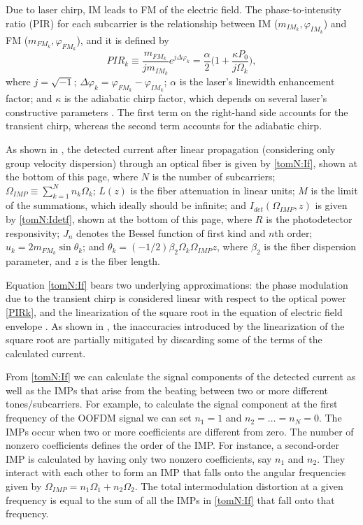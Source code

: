 \documentclass[journal]{IEEEtran}
\begin{document}
Due to laser chirp, IM leads to FM of the electric field. The phase-to-intensity ratio (PIR) \cite{eva} for each subcarrier is the relationship between IM ($m_{IM_k}, \varphi_{IM_k}$) and FM ($m_{FM_k}, \varphi_{FM_k}$), and it is defined by
\begin{equation} \label{PIRk}
PIR_k \equiv \frac{m_{FM_k}}{jm_{IM_k}}e^{j\Delta\varphi_k} = \frac{\alpha}{2}\bigg(1 + \frac{\kappa P_0}{j\Omega_k}\bigg),
\end{equation}
where $j=\sqrt{-1}$; $\Delta\varphi_k = \varphi_{FM_k} - \varphi_{IM_k}$; $\alpha$ is the laser's linewidth enhancement factor; and $\kappa$ is the adiabatic chirp factor, which depends on several laser's constructive parameters \cite{corvini}. The first term on the right-hand side accounts for the transient chirp, whereas the second term accounts for the adiabatic chirp. 

As shown in \cite{eva}, the detected current after linear propagation (considering only group velocity dispersion) through an optical fiber is given by \eqref{tomN:If}, shown at the bottom of this page, where $N$ is the number of subcarriers; $\Omega_{IMP} \equiv \sum_{k = 1}^N n_k\Omega_k$; $L(z)$ is the fiber attenuation in linear units; $M$ is the limit of the summations, which ideally should be infinite; and $I_{det}(\Omega_{IMP},z)$ is given by \eqref{tomN:Idetf}, shown at the bottom of this page, where $R$ is the photodetector responsivity; $J_n$ denotes the Bessel function of first kind and $n$th order; $u_k = 2m_{FM_k}\sin\theta_k$; and $\theta_k = (-1/2)\beta_2\Omega_k\Omega_{IMP}z$, where $\beta_2$ is the fiber dispersion parameter, and \emph{z} is the fiber length. 

Equation \eqref{tomN:If} bears two underlying approximations: the phase modulation due to the transient chirp is considered linear with respect to the optical power \eqref{PIRk}, and the linearization of the square root in the equation of electric field envelope \cite[eq. 3]{eva}. As shown in \cite{comments}, the inaccuracies introduced by the linearization of the square root are partially mitigated by discarding some of the terms of the calculated current.

From \eqref{tomN:If} we can calculate the signal components of the detected current as well as the IMPs that arise from the beating between two or more different tones/subcarriers. For example, to calculate the signal component at the first frequency of the OOFDM signal we can set $n_1 = 1$ and $n_2 = \ldots = n_N = 0$. The IMPs occur when two or more coefficients are different from zero. The number of nonzero coefficients defines the order of the IMP. For instance, a second-order IMP is calculated by having only two nonzero coefficients, say $n_1$ and $n_2$. They interact with each other to form an IMP that falls onto the angular frequencies given by $\Omega_{IMP} = n_1\Omega_1 + n_2\Omega_2$. The total intermodulation distortion at a given frequency is equal to the sum of all the IMPs in \eqref{tomN:If} that fall onto that frequency.
\end{document}
